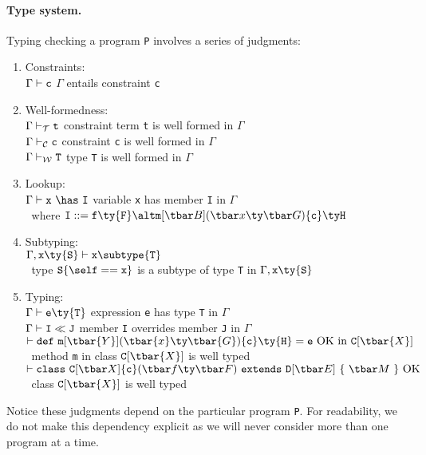 \paragraph{Type system.} Typing checking a program {\tt P} involves a series of judgments:
\begin{enumerate}
	\item Constraints:\\
	  $\Gamma\vdash {\tt c}$ \hfill $\Gamma$ entails constraint {\tt c}
	\item Well-formedness:\\
	  $\tj{\Gamma}{\tt t}$ \hfill constraint term {\tt t} is well formed in $\Gamma$\\
	  $\cj{\Gamma}{\tt c}$ \hfill constraint {\tt c} is well formed in $\Gamma$\\
	  $\wj{\Gamma}{\tt T}$ \hfill  type {\tt T} is well formed in $\Gamma$
	\item Lookup:\\
	  $\Gamma\vdash {\tt x}~\has~{\tt I}$ \hfill variable {\tt x} has member {\tt I} in $\Gamma$\\
	  $~$ \hfill where ${\tt I}::= {\tt f}\ty{\tt F} \alt \msign{B}{x}{G}{c}{H}$
	\item Subtyping:\\
	  $\Gamma,{\tt x}\ty{\tt S}\vdash{\tt x}\subtype{\tt T}$ \\ $~$ \hfill type ${\tt S}\{\self=={\tt x}\}$ is a 	subtype of type {\tt T} in $\Gamma,{\tt x}\ty{\tt S}$
	\item Typing:\\
	  $\Gamma\vdash {\tt e}\ty{\tt T}$ \hfill expression {\tt e} has type {\tt T} in $\Gamma$\\
	  $\Gamma\vdash {\tt I}\ll {\tt J}$ \hfill member {\tt I} overrides member {\tt J} in $\Gamma$\\
	  $\vdash {\tt def}~{\tt m}[\tbar{Y}](\tbar{x}\ty \tbar{G})\{{\tt c}\}\ty {\tt H}={\tt e}~{\rm OK~in}~{\tt C}[\tbar{X}]$ \\ $~$ \hfill method {\tt m} in class ${\tt C}[\tbar{X}]$ is well typed\\
	  $\vdash \cdecl~{\rm OK}$ \\ $~$ \hfill class ${\tt C}[\tbar{X}]$ is well typed

\end{enumerate}

Notice these judgments depend on the particular program {\tt P}. For readability, we do not make this dependency explicit as we will never consider more than one program at a time.

